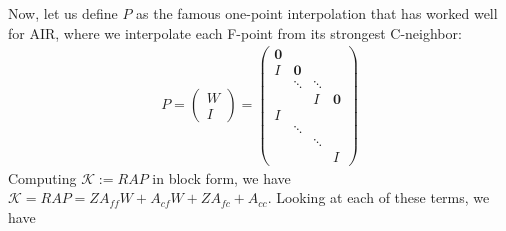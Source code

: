 \documentclass[a4paper,12pt]{article}
\begin{document}
%
Now, let us define $P$ as the famous one-point interpolation that has worked well for AIR, where we
interpolate each F-point from its strongest C-neighbor:
%
\begin{align*}
P = \begin{pmatrix} W \\ I \end{pmatrix} = 
\begin{pmatrix}
\mathbf{0} \\ 
I & \mathbf{0} \\
& \ddots & \ddots\\
& & I & \mathbf{0} \\ \hline
I \\
& \ddots \\
& & \ddots \\
& & & I
\end{pmatrix}
\end{align*}
%
Computing $\mathcal{K} := RAP$ in block form, we have $\mathcal{K} = RAP = ZA_{ff}W + A_{cf}W 
+ ZA_{fc}+A_{cc}$. Looking at each of these terms, we have
%
\end{document}

